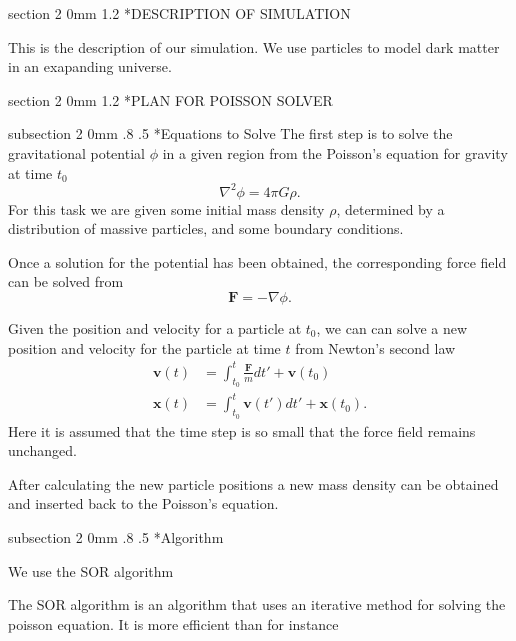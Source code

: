 \documentclass[titlepage, 11pt]{article}
\makeatletter
\renewcommand{\section}{\@startsection
        {section}
        {2}
        {0mm}
        {1.2\baselineskip}
        {\baselineskip}
        {\centering\normalsize}}
\renewcommand{\subsection}{\@startsection
        {subsection}
        {2}
        {0mm}
        {.8\baselineskip}
        {.5\baselineskip}
        {\bfseries\normalsize}}
\makeatother
\begin{document}
%

\section*{DESCRIPTION OF SIMULATION}

This is the description of our simulation. We use particles to model dark
matter in an exapanding universe.

\section*{PLAN FOR POISSON SOLVER}

\subsection*{Equations to Solve}
The first step is to solve the gravitational potential $\phi$ in a given region 
from the Poisson's equation for gravity at time $t_0$
\begin{equation}
\nabla^2 \phi = 4\pi G\rho. 
\end{equation}
For this task we are given some initial mass density $\rho$, determined by a 
distribution of massive particles, and some boundary conditions.

Once a solution for the potential has been obtained, the corresponding force
field can be solved from 
\begin{equation}
\mathbf{F} = -\nabla \phi.
\end{equation}

Given the position and velocity for a particle at $t_0$, we can can solve a 
new position and velocity for the particle at time $t$ from Newton's second law
\begin{align}
\mathbf{v}(t) &= \int_{t_0}^{t}\frac{\mathbf{F}}{m}dt' + \mathbf{v}(t_0)\\
\mathbf{x}(t) &= \int_{t_0}^{t}\mathbf{v}(t')dt' + \mathbf{x}(t_0).
\end{align}
Here it is assumed that the time step is so small that the force field remains 
unchanged.

After calculating the new particle positions a new mass density can be
obtained and inserted back to the Poisson's equation.




\subsection*{Algorithm}

We use the SOR algorithm

The SOR algorithm is an algorithm that uses an iterative method for solving the poisson equation. It is more efficient than for instance 
\end{document}

